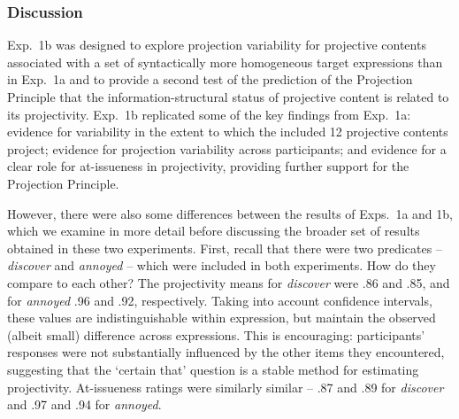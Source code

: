 \documentclass[11pt,fleqn]{article}
\newcommand{\6}{\mbox{$[\hspace*{-.6mm}[$}}
\newcommand{\9}{\mbox{$]\hspace*{-.6mm}]$}}
\begin{document}
%
%
%
%


\subsubsection{Discussion}

Exp.~1b was designed to explore projection variability for projective contents associated with a set of syntactically more homogeneous target expressions than in Exp.~1a and to provide a second test of the prediction of the Projection Principle  that the information-structural status of projective content is related to its projectivity. Exp.~1b replicated some of the key findings from Exp.~1a: evidence for variability in the extent to which the included 12 projective contents project;  evidence for projection variability across participants; and evidence for a clear role for at-issueness in projectivity, providing further support for the Projection Principle. 

However, there were also some differences between the results of Exps.~1a and 1b, which we examine in more detail before discussing the broader set of results obtained in these two experiments. First, recall that there were two predicates -- \emph{discover} and \emph{annoyed} -- which were included in both experiments. How do they compare to each other? The projectivity means for \emph{discover} were .86 and .85, and for \emph{annoyed} .96 and .92, respectively. Taking into account confidence intervals, these values are indistinguishable within expression, but maintain the observed (albeit small) difference across expressions. This is encouraging: participants' responses were not substantially influenced by the other items they encountered, suggesting that the `certain that' question is a stable method for estimating projectivity. At-issueness ratings were similarly similar -- .87 and .89 for \emph{discover} and .97 and .94 for \emph{annoyed}.

\end{document}
